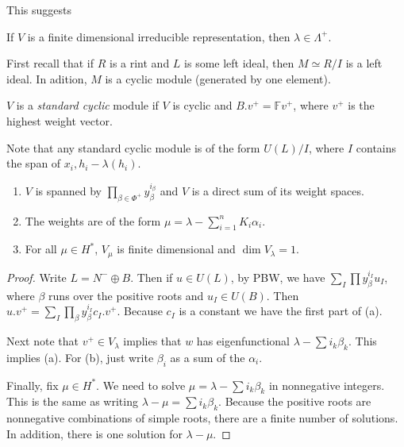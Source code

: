 \documentclass[twoside, 10pt]{article}
\newcommand{\F}{\mathbb{F}}
\begin{document}
    This suggests
    \begin{prop}
        If $V$ is a finite dimensional irreducible representation, then $\lambda \in \Lambda^+$.
    \end{prop}
    
    First recall that if $R$ is a rint and $L$ is some left ideal, then $M \simeq R/I$ is a left ideal. In adition, $M$ is a cyclic module (generated by one element).
    \begin{defn}
        $V$ is a \textit{standard cyclic} module if $V$ is cyclic and $B.v^+ = \F v^+$, where $v^+$ is the highest weight vector.
    \end{defn}
    Note that any standard cyclic module is of the form $U(L)/I$, where $I$ contains the span of $x_i, h_i - \lambda(h_i)$.

    \begin{thm}
        \begin{enumerate}[label=(\alph*)]
            \item $V$ is spanned by $\prod_{\beta \in \Phi^+}y_{\beta}^{i_{\beta}}$ and $V$ is a direct sum of its weight spaces.
            \item The weights are of the form $\mu = \lambda - \sum_{i=1}^n K_i \alpha_i$.
            \item For all $\mu \in H^*$, $V_{\mu}$ is finite dimensional and $\dim V_{\lambda} = 1$.
        \end{enumerate}
    \end{thm}

    \begin{proof}
        Write $L = N^- \oplus B$. Then if $u \in U(L)$, by PBW, we have $\sum_I \prod y_{\beta}^{i_I} u_I$, where $\beta$ runs over the positive roots and $u_I \in U(B)$. Then $u.v^+ = \sum_I \prod_{\beta} y_{\beta}^{i_I} c_I.v^+$. Because $c_I$ is a constant we have the first part of (a).

        Next note that $v^+ \in V_{\lambda}$ implies that $w$ has eigenfunctional $\lambda - \sum i_k \beta_k$. This implies (a). For (b), just write $\beta_i$ as a sum of the $\alpha_i$.

        Finally, fix $\mu \in H^*$. We need to solve $\mu = \lambda - \sum i_k \beta_k$ in nonnegative integers. This is the same as writing $\lambda - \mu = \sum i_k \beta_k$. Because the positive roots are nonnegative combinations of simple roots, there are a finite number of solutions. In addition, there is one solution for $\lambda - \mu$.
    \end{proof}
\end{document}
